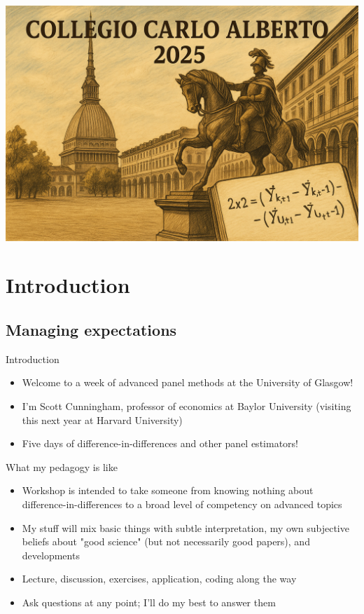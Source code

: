 \documentclass{beamer}
\begin{document}
\begin{frame}[plain]  %
\vfill
\begin{center}
  \includegraphics[width=0.85\linewidth]{./lecture_includes/banner_cropped}
\end{center}
\vfill
\end{frame}


\section{Introduction}

\subsection{Managing expectations}


\begin{frame}{Introduction}

\begin{itemize}
\item Welcome to a week of advanced panel methods at the University of Glasgow!
\item I'm Scott Cunningham, professor of economics at Baylor University (visiting this next year at Harvard University)
\item Five days of difference-in-differences and other panel estimators!
\end{itemize}

\end{frame}


\begin{frame}{What my pedagogy is like}

\begin{itemize}
\item Workshop is intended to take someone from knowing nothing about difference-in-differences to a broad level of competency on advanced topics
\item My stuff will mix basic things with subtle interpretation, my own subjective beliefs about "good science" (but not necessarily good papers), and developments
\item Lecture, discussion, exercises, application, coding along the way
\item Ask questions at any point; I'll do my best to answer them
\end{itemize}

\end{frame}
\end{document}
